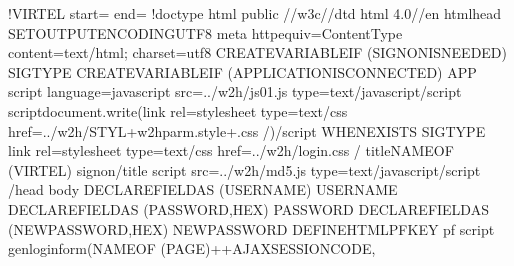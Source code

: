 \documentclass[letterpaper,10pt,english]{sphinxmanual}
\begin{document}
\begin{sphinxVerbatim}[commandchars=\\\{\}]
\PYGZlt{}!\PYGZhy{}\PYGZhy{}VIRTEL start=\PYGZdq{}\PYGZob{}\PYGZob{}\PYGZob{}\PYGZdq{} end=\PYGZdq{}\PYGZcb{}\PYGZcb{}\PYGZcb{}\PYGZdq{} \PYGZhy{}\PYGZhy{}\PYGZgt{}
\PYGZlt{}!doctype html public \PYGZdq{}\PYGZhy{}//w3c//dtd html 4.0//en\PYGZdq{}\PYGZgt{}
\PYGZlt{}html\PYGZgt{}\PYGZlt{}head\PYGZgt{}\PYGZob{}\PYGZob{}\PYGZob{} SET\PYGZhy{}OUTPUT\PYGZhy{}ENCODING\PYGZhy{}UTF\PYGZhy{}8 \PYGZdq{}\PYGZdq{} \PYGZcb{}\PYGZcb{}\PYGZcb{}
\PYGZlt{}meta http\PYGZhy{}equiv=\PYGZdq{}Content\PYGZhy{}Type\PYGZdq{} content=\PYGZdq{}text/html; charset=utf\PYGZhy{}8\PYGZdq{}\PYGZgt{}
\PYGZob{}\PYGZob{}\PYGZob{}CREATE\PYGZhy{}VARIABLE\PYGZhy{}IF (SIGNON\PYGZhy{}IS\PYGZhy{}NEEDED) \PYGZdq{}\PYGZdl{}\PYGZdl{}SIGTYPE\PYGZdq{}\PYGZcb{}\PYGZcb{}\PYGZcb{}
\PYGZob{}\PYGZob{}\PYGZob{}CREATE\PYGZhy{}VARIABLE\PYGZhy{}IF (APPLICATION\PYGZhy{}IS\PYGZhy{}CONNECTED) \PYGZdq{}\PYGZdl{}\PYGZdl{}APP\PYGZdq{}\PYGZcb{}\PYGZcb{}\PYGZcb{}
    \PYGZlt{}script language=\PYGZdq{}javascript\PYGZdq{} src=\PYGZdq{}../w2h/js01.js\PYGZdq{}
type=\PYGZdq{}text/javascript\PYGZdq{}\PYGZgt{}\PYGZlt{}/script\PYGZgt{}
    \PYGZlt{}script\PYGZgt{}document.write(\PYGZdq{}\PYGZlt{}link rel=\PYGZsq{}stylesheet\PYGZsq{} type=\PYGZsq{}text/css\PYGZsq{}
href=\PYGZsq{}../w2h/STYL\PYGZdq{}+w2hparm.style+\PYGZdq{}.css\PYGZsq{} /\PYGZgt{}\PYGZdq{})\PYGZlt{}/script\PYGZgt{}
    \PYGZob{}\PYGZob{}\PYGZob{}WHEN\PYGZhy{}EXISTS \PYGZdq{}\PYGZdl{}\PYGZdl{}SIGTYPE\PYGZdq{}\PYGZcb{}\PYGZcb{}\PYGZcb{}
    \PYGZlt{}link rel=\PYGZdq{}stylesheet\PYGZdq{} type=\PYGZdq{}text/css\PYGZdq{} href=\PYGZdq{}../w2h/login.css\PYGZdq{} /\PYGZgt{}
    \PYGZlt{}title\PYGZgt{}\PYGZob{}\PYGZob{}\PYGZob{}NAME\PYGZhy{}OF (VIRTEL)\PYGZcb{}\PYGZcb{}\PYGZcb{} signon\PYGZlt{}/title\PYGZgt{}
    \PYGZlt{}script src=\PYGZdq{}../w2h/md5.js\PYGZdq{} type=\PYGZdq{}text/javascript\PYGZdq{}\PYGZgt{}\PYGZlt{}/script\PYGZgt{}
\PYGZlt{}/head\PYGZgt{}
\PYGZlt{}body\PYGZgt{}
\PYGZob{}\PYGZob{}\PYGZob{}DECLARE\PYGZhy{}FIELD\PYGZhy{}AS (USERNAME) \PYGZdq{}USERNAME\PYGZdq{}\PYGZcb{}\PYGZcb{}\PYGZcb{}
\PYGZob{}\PYGZob{}\PYGZob{}DECLARE\PYGZhy{}FIELD\PYGZhy{}AS (PASSWORD,HEX) \PYGZdq{}PASSWORD\PYGZdq{}\PYGZcb{}\PYGZcb{}\PYGZcb{}
\PYGZob{}\PYGZob{}\PYGZob{}DECLARE\PYGZhy{}FIELD\PYGZhy{}AS (NEW\PYGZhy{}PASSWORD,HEX) \PYGZdq{}NEWPASSWORD\PYGZdq{}\PYGZcb{}\PYGZcb{}\PYGZcb{}
\PYGZob{}\PYGZob{}\PYGZob{}DEFINE\PYGZhy{}HTML\PYGZhy{}PFKEY \PYGZdq{}pf\PYGZdq{}\PYGZcb{}\PYGZcb{}\PYGZcb{}
\PYGZlt{}script\PYGZgt{}
genloginform(\PYGZdq{}\PYGZob{}\PYGZob{}\PYGZob{}NAME\PYGZhy{}OF (PAGE)\PYGZcb{}\PYGZcb{}\PYGZcb{}++\PYGZob{}\PYGZob{}\PYGZob{}AJAX\PYGZhy{}SESSION\PYGZhy{}CODE\PYGZcb{}\PYGZcb{}\PYGZcb{}\PYGZdq{},

\end{sphinxVerbatim}
\end{document}
